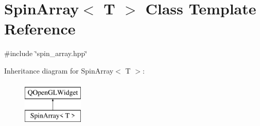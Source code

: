 \hypertarget{classSpinArray}{}\section{Spin\+Array$<$ T $>$ Class Template Reference}
\label{classSpinArray}


{\ttfamily \#include \char`\"{}spin\+\_\+array.\+hpp\char`\"{}}

Inheritance diagram for Spin\+Array$<$ T $>$\+:\begin{figure}[H]
\begin{center}
\leavevmode
\includegraphics[height=2.000000cm]{classSpinArray}
\end{center}
\end{figure}
